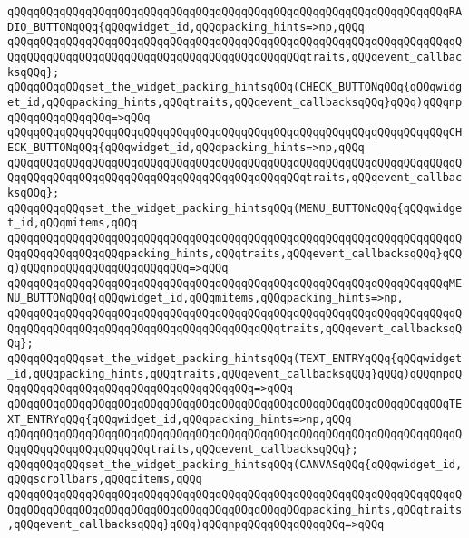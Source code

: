 \verb|qQQqqQQqqQQqqQQqqQQqqQQqqQQqqQQqqQQqqQQqqQQqqQQqqQQqqQQqqQQqqQQqqQQqRADIO_BUTTONqQQq{qQQqwidget_id,qQQqpacking_hints=>np,qQQq|\newline
\verb|qQQqqQQqqQQqqQQqqQQqqQQqqQQqqQQqqQQqqQQqqQQqqQQqqQQqqQQqqQQqqQQqqQQqqQQqqQQqqQQqqQQqqQQqqQQqqQQqqQQqqQQqqQQqqQQqqQQqtraits,qQQqevent_callbacksqQQq};|\newline
\verb|qQQqqQQqqQQqset_the_widget_packing_hintsqQQq(CHECK_BUTTONqQQq{qQQqwidget_id,qQQqpacking_hints,qQQqtraits,qQQqevent_callbacksqQQq}qQQq)qQQqnpqQQqqQQqqQQqqQQq=>qQQq|\newline
\verb|qQQqqQQqqQQqqQQqqQQqqQQqqQQqqQQqqQQqqQQqqQQqqQQqqQQqqQQqqQQqqQQqqQQqCHECK_BUTTONqQQq{qQQqwidget_id,qQQqpacking_hints=>np,qQQq|\newline
\verb|qQQqqQQqqQQqqQQqqQQqqQQqqQQqqQQqqQQqqQQqqQQqqQQqqQQqqQQqqQQqqQQqqQQqqQQqqQQqqQQqqQQqqQQqqQQqqQQqqQQqqQQqqQQqqQQqqQQqtraits,qQQqevent_callbacksqQQq};|\newline
\verb|qQQqqQQqqQQqset_the_widget_packing_hintsqQQq(MENU_BUTTONqQQq{qQQqwidget_id,qQQqmitems,qQQq|\newline
\verb|qQQqqQQqqQQqqQQqqQQqqQQqqQQqqQQqqQQqqQQqqQQqqQQqqQQqqQQqqQQqqQQqqQQqqQQqqQQqqQQqqQQqqQQqpacking_hints,qQQqtraits,qQQqevent_callbacksqQQq}qQQq)qQQqnpqQQqqQQqqQQqqQQqqQQq=>qQQq|\newline
\verb|qQQqqQQqqQQqqQQqqQQqqQQqqQQqqQQqqQQqqQQqqQQqqQQqqQQqqQQqqQQqqQQqqQQqMENU_BUTTONqQQq{qQQqwidget_id,qQQqmitems,qQQqpacking_hints=>np,|\newline
\verb|qQQqqQQqqQQqqQQqqQQqqQQqqQQqqQQqqQQqqQQqqQQqqQQqqQQqqQQqqQQqqQQqqQQqqQQqqQQqqQQqqQQqqQQqqQQqqQQqqQQqqQQqqQQqqQQqtraits,qQQqevent_callbacksqQQq};|\newline
\verb|qQQqqQQqqQQqset_the_widget_packing_hintsqQQq(TEXT_ENTRYqQQq{qQQqwidget_id,qQQqpacking_hints,qQQqtraits,qQQqevent_callbacksqQQq}qQQq)qQQqnpqQQqqQQqqQQqqQQqqQQqqQQqqQQqqQQqqQQqqQQq=>qQQq|\newline
\verb|qQQqqQQqqQQqqQQqqQQqqQQqqQQqqQQqqQQqqQQqqQQqqQQqqQQqqQQqqQQqqQQqqQQqTEXT_ENTRYqQQq{qQQqwidget_id,qQQqpacking_hints=>np,qQQq|\newline
\verb|qQQqqQQqqQQqqQQqqQQqqQQqqQQqqQQqqQQqqQQqqQQqqQQqqQQqqQQqqQQqqQQqqQQqqQQqqQQqqQQqqQQqqQQqqQQqtraits,qQQqevent_callbacksqQQq};|\newline
\verb|qQQqqQQqqQQqset_the_widget_packing_hintsqQQq(CANVASqQQq{qQQqwidget_id,qQQqscrollbars,qQQqcitems,qQQq|\newline
\verb|qQQqqQQqqQQqqQQqqQQqqQQqqQQqqQQqqQQqqQQqqQQqqQQqqQQqqQQqqQQqqQQqqQQqqQQqqQQqqQQqqQQqqQQqqQQqqQQqqQQqqQQqqQQqqQQqqQQqpacking_hints,qQQqtraits,qQQqevent_callbacksqQQq}qQQq)qQQqnpqQQqqQQqqQQqqQQq=>qQQq|\newline
